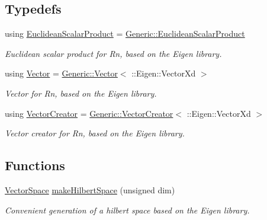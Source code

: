 \subsection*{Typedefs}
\begin{DoxyCompactItemize}
\item 
\hypertarget{group__EigenGroup_gaf2be4f79056513f7e3e35f7afdc794ee}{}using \hyperlink{group__EigenGroup_gaf2be4f79056513f7e3e35f7afdc794ee}{Euclidean\+Scalar\+Product} = \hyperlink{classSpacy_1_1Generic_1_1EuclideanScalarProduct}{Generic\+::\+Euclidean\+Scalar\+Product}\label{group__EigenGroup_gaf2be4f79056513f7e3e35f7afdc794ee}

\begin{DoxyCompactList}\small\item\em Euclidean scalar product for Rn, based on the Eigen library. \end{DoxyCompactList}\item 
using \hyperlink{group__VectorSpaceGroup_gafda42fd5aa3f7597a42b9831bf4dfd07}{Vector} = \hyperlink{classSpacy_1_1Generic_1_1Vector}{Generic\+::\+Vector}$<$ \+::Eigen\+::\+Vector\+Xd $>$
\begin{DoxyCompactList}\small\item\em Vector for Rn, based on the Eigen library. \end{DoxyCompactList}\item 
using \hyperlink{group__VectorSpaceGroup_gab3b27cb653ec69d12c809394126b046a}{Vector\+Creator} = \hyperlink{classSpacy_1_1Generic_1_1VectorCreator}{Generic\+::\+Vector\+Creator}$<$ \+::Eigen\+::\+Vector\+Xd $>$
\begin{DoxyCompactList}\small\item\em Vector creator for Rn, based on the Eigen library. \end{DoxyCompactList}\end{DoxyCompactItemize}
\subsection*{Functions}
\begin{DoxyCompactItemize}
\item 
\hyperlink{classSpacy_1_1VectorSpace}{Vector\+Space} \hyperlink{namespaceSpacy_1_1Rn_abadd5b9e11793fdb2f689a3ee908e5e7}{make\+Hilbert\+Space} (unsigned dim)
\begin{DoxyCompactList}\small\item\em Convenient generation of a hilbert space based on the Eigen library. \end{DoxyCompactList}\end{DoxyCompactItemize}


